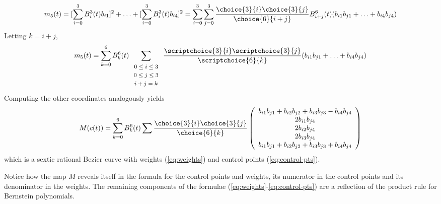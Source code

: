 \[ m_5(t) =  [\sum_{i=0}^3 B_i^3(t) b_{i1}]^2 + 
	\ldots + [\sum_{i=0}^3 B_i^3(t) b_{i4}]^2
     =   \sum_{i=0}^3 \sum_{j=0}^3 
	\frac{\choice{3}{i} \choice{3}{j}}{\choice{6}{i+j}}
       B^6_{i+j}(t) (b_{i1} b_{j1} + \ldots + b_{i4} b_{j4})
\]
Letting $k=i+j$, 
\[ m_5(t) = \sum_{k=0}^6 B_k^6(t) 
	\sum_{\begin{array}{c}  \mbox{\footnotesize{$0 \leq i \leq 3$}} \\ 
			     \mbox{\footnotesize{$0 \leq j \leq 3$}} \\ 
			     \mbox{\footnotesize{$i+j=k$}}
			     \end{array}} 
	\frac{\scriptchoice{3}{i} \scriptchoice{3}{j}}{\scriptchoice{6}{k}}
	(b_{i1} b_{j1} + \ldots + b_{i4} b_{j4}) \]
Computing the other coordinates analogously yields
\[ M(c(t)) = 
   \sum_{k=0}^6 B_k^6(t)
	\sum \frac{\choice{3}{i} \choice{3}{j}}{\choice{6}{k}}
	\left( \begin{array}{c}
            b_{i1} b_{j1} + b_{i2} b_{j2} + b_{i3} b_{j3} - b_{i4} b_{j4} \\
            2b_{i1} b_{j4} \\
            2b_{i2} b_{j4} \\
            2b_{i3} b_{j4} \\
            b_{i1} b_{j1} + b_{i2} b_{j2} + b_{i3} b_{j3} + b_{i4} b_{j4}
	\end{array} \right) \]
%
which is a sextic rational Bezier curve with weights (\ref{eq:weights}) and 
control points (\ref{eq:control-pts}).
\QED

Notice how the map $M$ reveals itself in the formula for the control points
and weights, its numerator in the control points and its denominator
in the weights.
The remaining components of the formulae (\ref{eq:weights}-\ref{eq:control-pts})
are a reflection of the product rule for Bernstein polynomials.

